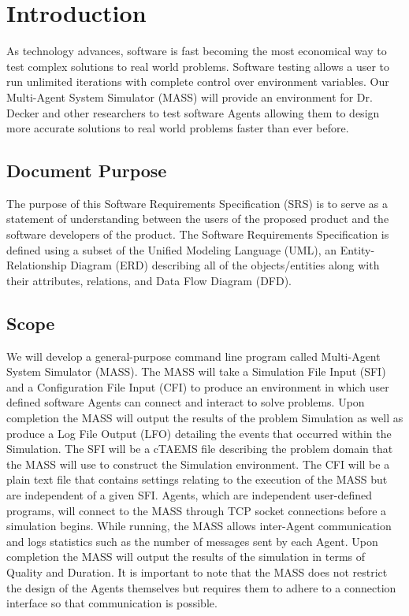 \chapter{Introduction}\label{chapter:introduction} %


As technology advances, software is fast becoming the most economical way to test complex solutions to real world problems. Software testing allows a user to run unlimited iterations with complete control over environment variables. Our Multi-Agent System Simulator (MASS) will provide an environment for Dr. Decker and other researchers to test software Agents allowing them to design more accurate solutions to real world problems faster than ever before.

\section{Document Purpose}

The purpose of this Software Requirements Specification (SRS) is to serve as a statement of understanding between the users of the proposed product and the software developers of the product. The Software Requirements Specification is defined using a subset of the Unified Modeling Language (UML), an Entity-Relationship Diagram (ERD) describing all of the objects/entities along with their attributes, relations, and Data Flow Diagram (DFD).

\section{Scope}

We will develop a general-purpose command line program called Multi-Agent System Simulator (MASS). The MASS will take a Simulation File Input (SFI) and a Configuration File Input (CFI) to produce an environment in which user defined software Agents can connect and interact to solve problems. Upon completion the MASS will output the results of the problem Simulation as well as produce a Log File Output (LFO) detailing the events that occurred within the Simulation. The SFI will be a cTAEMS file describing the problem domain that the MASS will use to construct the Simulation environment. The CFI will be a plain text file that contains settings relating to the execution of the MASS but are independent of a given SFI. Agents, which are independent user-defined programs, will connect to the MASS through TCP socket connections before a simulation begins. While running, the MASS allows inter-Agent communication and logs statistics such as the number of messages sent by each Agent. Upon completion the MASS will output the results of the simulation in terms of Quality and Duration. It is important to note that the MASS does not restrict the design of the Agents themselves but requires them to adhere to a connection interface so that communication is possible.


